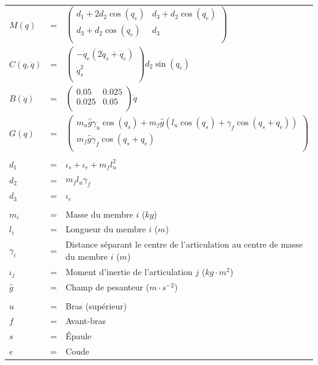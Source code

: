 \documentclass[pdftex,a4paper,11pt]{article}
\numberwithin{equation}{subsection}
\begin{document}
\paragraph{}
\begin{tabular}{lcl}
    $M(q)$ & = &
    $
    \begin{pmatrix}
        d_1 + 2 d_2 \cos(q_e)  & d_3 + d_2 \cos(q_e) \\
        d_3 + d_2 \cos(q_e) & d_3 \\
    \end{pmatrix}
    $ \\

    $C(q, \dot{q})$ & = &
    $
    \begin{pmatrix}
        -\dot{q}_e (2 \dot{q}_s + \dot{q}_e) \\
        \dot{q}_s^2 \\
    \end{pmatrix}
    d_2 \sin(q_e)
    $\\

    $B(\dot{q})$ & = &
    $
    \begin{pmatrix}
        0.05  & 0.025 \\
        0.025 & 0.05 \\
    \end{pmatrix}
    \dot{q}
    $\\

    $G(q)$ & = &
    $
    \begin{pmatrix}
        m_u \hat{g}  \gamma_u \cos(q_s) + m_f \hat{g} (l_u \cos(q_s) + \gamma_f \cos(q_s + q_e)) \\
        m_f \hat{g}  \gamma_f \cos(q_s + q_e) \\
    \end{pmatrix}
    $ \\

    \\
    $d_1$ & = & $\iota_s + \iota_e + m_f l_u^2$ \\
    $d_2$ & = & $m_f l_u \gamma_f$ \\
    $d_3$ & = & $\iota_e$ \\
    \\
    $m_i$      & = & Masse du membre $i$ ($kg$) \\
    $l_i$      & = & Longueur du membre $i$ ($m$) \\
    $\gamma_i$ & = & Distance séparant le centre de l'articulation au centre de masse du membre $i$ ($m$) \\
    $\iota_j$  & = & Moment d'inertie de l'articulation $j$ ($kg \cdot m^2$) \\
    $\hat{g}$  & = & Champ de pesanteur ($m \cdot s^{-2}$) \\
    \\

    $u$ & = & Bras (supérieur)\\
    $f$ & = & Avant-bras\\

    $s$ & = & Épaule\\
    $e$ & = & Coude\\
\end{tabular}
\end{document}
